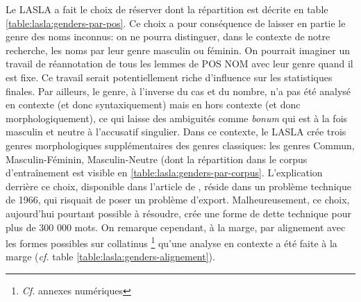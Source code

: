 \newpara

Le LASLA a fait le choix de réserver   \cite[p.~27]{BodsonCodification1966} dont la répartition est décrite en table \ref{table:lasla:genders-par-pos}. Ce choix a pour conséquence de laisser en partie le genre des noms inconnus: on ne pourra distinguer, dans le contexte de notre recherche, les noms par leur genre masculin ou féminin. On pourrait imaginer un travail de réannotation de tous les lemmes de POS NOM avec leur genre quand il est fixe. Ce travail serait potentiellement riche d'influence sur les statistiques finales. Par ailleurs, le genre, à l'inverse du cas et du nombre, n'a pas été analysé en contexte (et donc syntaxiquement) mais en hors contexte (et donc morphologiquement), ce qui laisse des ambiguités comme \textit{bonum} qui est à la fois masculin et neutre à l'accusatif singulier. Dans ce contexte, le LASLA crée trois genres morphologiques supplémentaires des genres classiques: les genres Commun, Masculin-Féminin, Masculin-Neutre (dont la répartition dans le corpus d'entraînement est visible en \ref{table:lasla:genders-par-corpus}. L'explication derrière ce choix, disponible dans l'article de \citep{BodsonCodification1966}, réside dans un problème technique de 1966, qui risquait de poser un problème d'export. Malheureusement, ce choix, aujourd'hui pourtant possible à résoudre, crée une forme de dette technique pour plus de 300 000 mots. On remarque cependant, à la marge, par alignement avec les formes possibles sur collatinus \footnote{\textit{Cf.} annexes numériques} qu'une analyse en contexte a été faite à la marge (\textit{cf.} table \ref{table:lasla:genders-alignement}).

